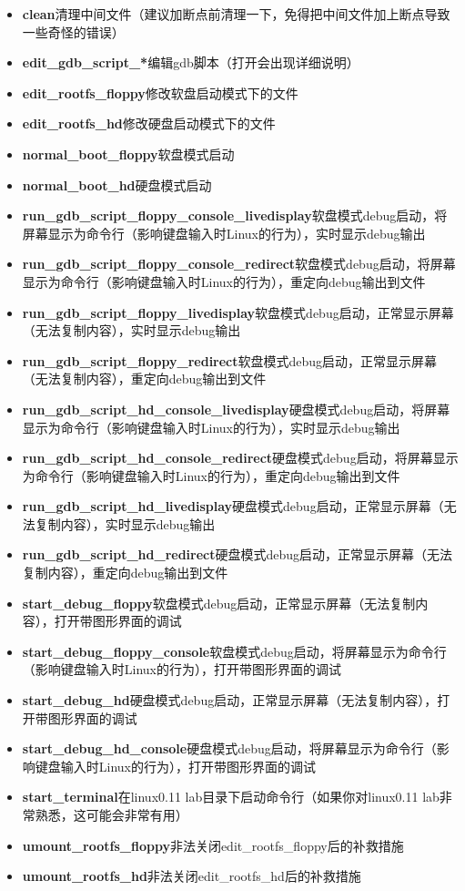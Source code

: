 \documentclass[]{report}
\begin{document}
\begin{itemize}
    \item \textbf{clean}\quad 清理中间文件（建议加断点前清理一下，免得把中间文件加上断点导致一些奇怪的错误）
    \item \textbf{edit\_gdb\_script\_*}\quad 编辑gdb脚本（打开会出现详细说明）
    \item \textbf{edit\_rootfs\_floppy}\quad 修改软盘启动模式下的文件
    \item \textbf{edit\_rootfs\_hd}\quad 修改硬盘启动模式下的文件
    \item \textbf{normal\_boot\_floppy}\quad 软盘模式启动
    \item \textbf{normal\_boot\_hd}\quad 硬盘模式启动
    \item \textbf{run\_gdb\_script\_floppy\_console\_livedisplay}\quad 软盘模式debug启动，将屏幕显示为命令行（影响键盘输入时Linux的行为），实时显示debug输出
    \item \textbf{run\_gdb\_script\_floppy\_console\_redirect}\quad 软盘模式debug启动，将屏幕显示为命令行（影响键盘输入时Linux的行为），重定向debug输出到文件
    \item \textbf{run\_gdb\_script\_floppy\_livedisplay}\quad 软盘模式debug启动，正常显示屏幕（无法复制内容），实时显示debug输出
    \item \textbf{run\_gdb\_script\_floppy\_redirect}\quad 软盘模式debug启动，正常显示屏幕（无法复制内容），重定向debug输出到文件
    \item \textbf{run\_gdb\_script\_hd\_console\_livedisplay}\quad 硬盘模式debug启动，将屏幕显示为命令行（影响键盘输入时Linux的行为），实时显示debug输出
    \item \textbf{run\_gdb\_script\_hd\_console\_redirect}\quad 硬盘模式debug启动，将屏幕显示为命令行（影响键盘输入时Linux的行为），重定向debug输出到文件
    \item \textbf{run\_gdb\_script\_hd\_livedisplay}\quad 硬盘模式debug启动，正常显示屏幕（无法复制内容），实时显示debug输出
    \item \textbf{run\_gdb\_script\_hd\_redirect}\quad 硬盘模式debug启动，正常显示屏幕（无法复制内容），重定向debug输出到文件
    \item \textbf{start\_debug\_floppy}\quad 软盘模式debug启动，正常显示屏幕（无法复制内容），打开带图形界面的调试
    \item \textbf{start\_debug\_floppy\_console}\quad 软盘模式debug启动，将屏幕显示为命令行（影响键盘输入时Linux的行为），打开带图形界面的调试
    \item \textbf{start\_debug\_hd}\quad 硬盘模式debug启动，正常显示屏幕（无法复制内容），打开带图形界面的调试
    \item \textbf{start\_debug\_hd\_console}\quad 硬盘模式debug启动，将屏幕显示为命令行（影响键盘输入时Linux的行为），打开带图形界面的调试
    \item \textbf{start\_terminal}\quad 在linux0.11 lab目录下启动命令行（如果你对linux0.11 lab非常熟悉，这可能会非常有用）
    \item \textbf{umount\_rootfs\_floppy}\quad 非法关闭edit\_rootfs\_floppy后的补救措施
    \item \textbf{umount\_rootfs\_hd}\quad 非法关闭edit\_rootfs\_hd后的补救措施
\end{itemize}
\end{document}
